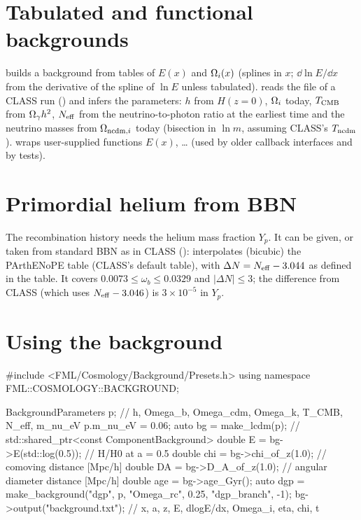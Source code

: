 \section{Tabulated and functional backgrounds}

 builds a background from tables of $E(x)$ and $\Omega_i(x)$ (splines in $x$; $\dd\ln E/\dd x$
from the derivative of the spline of $\ln E$ unless tabulated).  reads the
 file of a CLASS run () and infers the parameters: $h$ from
$H(z=0)$, $\Omega_i$ today, $T_{\rm CMB}$ from $\Omega_\gamma h^2$, $N_{\rm eff}$ from the neutrino-to-photon ratio at the
earliest time and the neutrino masses from $\Omega_{{\rm ncdm},i}$ today (bisection in $\ln m$, assuming CLASS's
$T_{\rm ncdm}$).  wraps user-supplied functions $E(x)$, \ldots{} (used by older callback
interfaces and by tests).

\section{Primordial helium from BBN}

The recombination history needs the helium mass fraction $Y_p$. It can be given, or taken from standard BBN as in
CLASS ():  interpolates (bicubic) the PArthENoPE table
\cite{Pisanti2008}  (CLASS's default table), with
$\Delta N=N_{\rm eff}-3.044$ as defined in the table. It covers $0.0073\le\omega_b\le0.0329$ and $|\Delta N|\le3$;
the difference from CLASS (which uses $N_{\rm eff}-3.046$) is $3\times10^{-5}$ in $Y_p$.

\section{Using the background}

\begin{cppcode}
#include <FML/Cosmology/Background/Presets.h>
using namespace FML::COSMOLOGY::BACKGROUND;

BackgroundParameters p;                 // h, Omega_b, Omega_cdm, Omega_k, T_CMB, N_eff, m_nu_eV
p.m_nu_eV = {0.06};
auto bg = make_lcdm(p);                 // std::shared_ptr<const ComponentBackground>
double E    = bg->E(std::log(0.5));     // H/H0 at a = 0.5
double chi  = bg->chi_of_z(1.0);        // comoving distance [Mpc/h]
double DA   = bg->D_A_of_z(1.0);        // angular diameter distance [Mpc/h]
double age  = bg->age_Gyr();
auto dgp = make_background("dgp", p, {{"Omega_rc", 0.25}, {"dgp_branch", -1}});
bg->output("background.txt");           // x, a, z, E, dlogE/dx, Omega_i, eta, chi, t
\end{cppcode}


